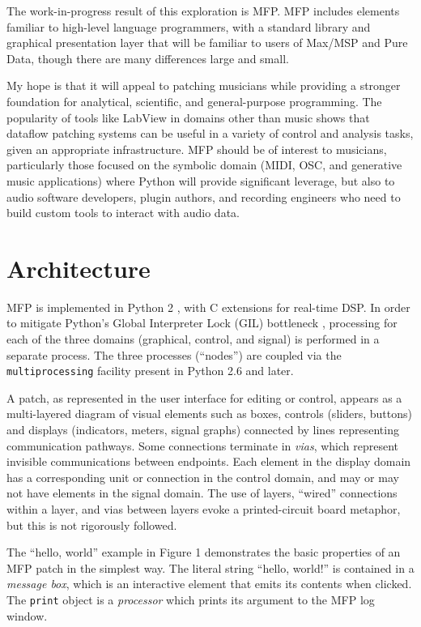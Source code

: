 \documentclass[11pt,a4paper]{article}
\begin{document}
The work-in-progress result of this exploration is MFP.  MFP includes
elements familiar to high-level language programmers, with a standard
library and graphical presentation layer that will be familiar to users of
Max/MSP and Pure Data, though there are many differences large and small. 

My hope is that it will appeal to patching musicians while providing a
stronger foundation for analytical, scientific, and general-purpose
programming.  The popularity of tools like LabView in domains other 
than music shows that dataflow patching systems can be useful in a variety
of control and analysis tasks, given an appropriate infrastructure.  MFP
should be of interest to musicians, particularly those focused on the
symbolic domain (MIDI, OSC, and generative music applications) where Python
will provide significant leverage, but also to audio software developers,
plugin authors, and recording engineers who need to build custom tools to
interact with audio data.

\section{Architecture}

MFP is implemented in Python 2 \cite{Python:2.7}, with C extensions for
real-time DSP.  In order to mitigate Python's Global Interpreter Lock (GIL)
bottleneck \cite{Python:GIL}, processing for each of the three domains
(graphical, control, and signal) is performed in a separate process.  The
three processes (``nodes'') are coupled via the \texttt{multiprocessing}
facility present in Python 2.6 and later. 

A patch, as represented in the user interface for editing or control,
appears as a multi-layered diagram of visual elements such as boxes,
controls (sliders, buttons) and displays (indicators, meters, signal
graphs) connected by lines representing communication pathways.  Some
connections terminate in \emph{vias}, which represent invisible communications
between endpoints.  Each element in the display domain has a corresponding
unit or connection in the control domain, and may or may not have elements
in the signal domain. The use of layers, ``wired'' connections within a
layer, and vias between layers evoke a printed-circuit board metaphor, but
this is not rigorously followed. 

The ``hello, world'' example in Figure 1 demonstrates the basic properties
of an MFP patch in the simplest way.  The literal string ``hello, world!''
is contained in a \emph{message box}, which is an interactive element that
emits its contents when clicked.  The \texttt{print} object is a
\emph{processor} which prints its argument to the MFP log window.  
\end{document}
